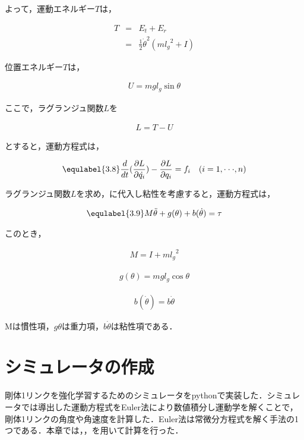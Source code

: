 よって，運動エネルギー$T$は，

\begin{eqnarray}
  T
  &=&E_{t} + E_{r} \nonumber \\
  &=&\frac{1}{2}{\dot{\theta}}^2(m{l_{g}}^2 + I)
\end{eqnarray}

位置エネルギー$T$は，

\begin{eqnarray}
  U
  = mgl_{g}\sin\theta
\end{eqnarray}

ここで，ラグランジュ関数$L$を

\begin{eqnarray}
  L
  =T - U
\end{eqnarray}

とすると，運動方程式は，

\begin{eqnarray}
  \equlabel{3.8}
  \frac{d}{dt}(\frac{\partial L}{\partial \dot{q_{i}}}) - \frac{\partial L}{\partial q_{i}} = f_{i} \quad (i = 1,\cdot\cdot\cdot, n)
\end{eqnarray}

ラグランジュ関数$L$を求め，に代入し粘性を考慮すると，運動方程式は，

\begin{eqnarray}
  \equlabel{3.9}
  M\ddot{\theta} + g(\theta) + b(\dot{\theta}) = \tau
\end{eqnarray}

このとき，

\begin{eqnarray}
  M = I + m{l_{g}}^2
\end{eqnarray}

\begin{eqnarray}
  g(\theta) = mgl_{g}\cos\theta
\end{eqnarray}

\begin{eqnarray}
  b(\dot{\theta}) = b\dot{\theta}
\end{eqnarray}

Mは慣性項，$g\theta$は重力項，$b\dot{\theta}$は粘性項である．

\section{シミュレータの作成}
剛体1リンクを強化学習するためのシミュレータをpythonで実装した．シミュレータでは導出した運動方程式をEuler法により数値積分し運動学を解くことで，剛体1リンクの角度や角速度を計算した．Euler法は常微分方程式を解く手法の1つである．本章では，，を用いて計算を行った．\\

